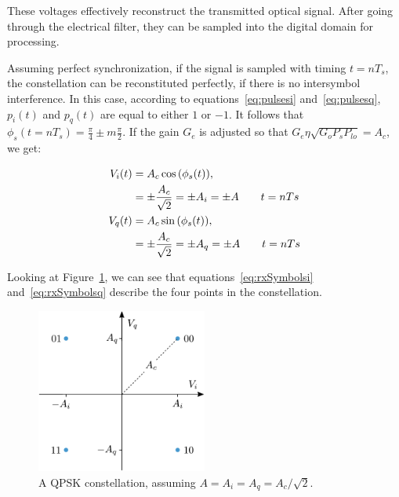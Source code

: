 	These voltages effectively reconstruct the transmitted optical signal.
	After going through the electrical filter, they can be sampled
	into the digital domain for processing.

	Assuming perfect synchronization, if the signal is sampled with timing $t =
	n T_s$, the constellation can be reconstituted perfectly, if there is no
	intersymbol interference. In this case, according to
	equations~\ref{eq:pulsesi} and~\ref{eq:pulsesq}, $p_i(t)$ and $p_q(t)$ are
	equal to either $1$ or $-1$. It follows that $\phi_s(t = nT_s) = \frac{\pi}{4}
	\pm m \frac{\pi}{2}$. If the gain $G_e$ is adjusted so that $ G_e\eta\sqrt{G_o P_s
	P_{lo}} = A_c$, we get:

	\begin{align}
		V_i(t) &= {A_c} \cos{(\phi_{s}(t))}, \notag \\
					 &= \pm \frac{A_c}{\sqrt{2}} = \pm A_i = \pm A \qquad t = nTs \label{eq:rxSymbolsi} \\
		V_q(t) &= {A_c} \sin{(\phi_{s}(t))}, \notag \\
					 &= \pm \frac{A_c}{\sqrt{2}} = \pm A_q = \pm A \qquad t = nTs \label{eq:rxSymbolsq}
	\end{align}




	Looking at Figure~\ref{fig:rxConst}, we can see that
	equations~\ref{eq:rxSymbolsi} and~\ref{eq:rxSymbolsq} describe the four points in the
	constellation.

	\begin{figure}[H]
		\centering
		\includegraphics[width=0.5\textwidth]{./sdf/m_qam_system/figures/constellationRx.pdf}
		\caption{A QPSK constellation, assuming $ A = A_i = A_q =
			A_c/\sqrt{2}$.\label{fig:rxConst}}
	\end{figure}

